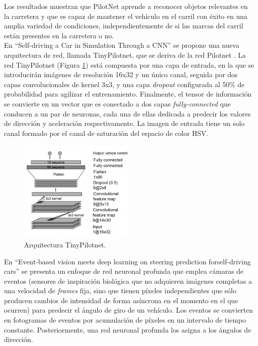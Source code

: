 Los resultados muestran que PilotNet aprende a reconocer objetos relevantes en la carretera y que es capaz de mantener el vehículo en el carril con éxito en una amplia variedad de condiciones, independientemente de si las marcas del carril están presentes en la carretera o no.\\


En ``Self-driving a Car in Simulation Through a CNN'' \cite{self-driving} se propone una nueva arquitectura de red, llamada TinyPilotnet, que se deriva de la red Pilotnet \cite{end2end} \cite{explaining-end2end}. La red TinyPilotnet (Figura \ref{fig.tinypilotnet}) está compuesta por una capa de entrada, en la que se introducirán imágenes de resolución 16x32 y un único canal, seguida por dos capas convolucionales de kernel 3x3, y una capa \textit{dropout} configurada al 50\% de probabilidad para agilizar el entrenamiento. Finalmente, el tensor de información se convierte en un vector que es conectado a dos capas \textit{fully-connected} que conducen a un par de neuronas, cada una de ellas dedicada a predecir los valores de dirección y aceleración respectivamente. La imagen de entrada tiene un solo canal formado por el canal de saturación del espacio de color HSV.\\

\begin{figure}
\begin{center}
	\includegraphics[width=0.5\textwidth]{figures/Estado_arte/tinypilotnet.png}
   \caption{Arquitectura TinyPilotnet.}
	\label{fig.tinypilotnet}
\end{center}
\end{figure}

En ``Event-based  vision  meets  deep  learning  on  steering  prediction  forself-driving  cars'' \cite{event} se presenta un enfoque de red neuronal profunda que emplea cámaras de eventos (sensores de inspiración biológica que no adquieren imágenes completas a una velocidad de \textit{frames} fija, sino que tienen píxeles independientes que sólo producen cambios de intensidad de forma asíncrona en el momento en el que ocurren) para predecir el ángulo de giro de un vehículo. Los eventos se convierten en fotogramas de eventos por acumulación de píxeles en un intervalo de tiempo constante. Posteriormente, una red neuronal profunda los asigna a los ángulos de dirección.\\


